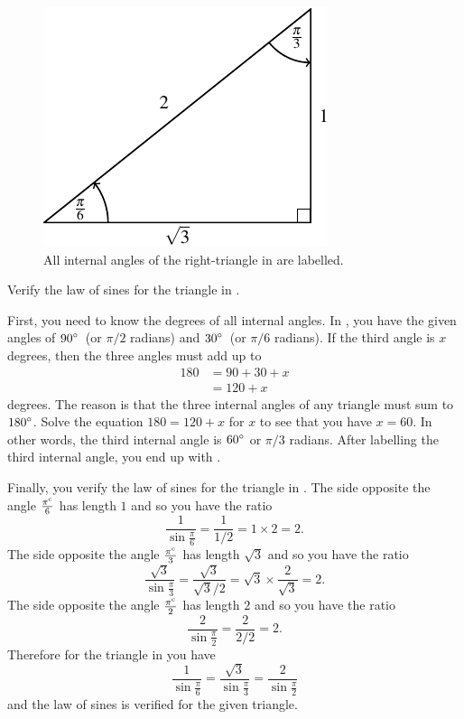 \documentclass[a4paper,oneside,12pt]{article}
\begin{document}
\begin{figure}[!htbp]
\centering
\includegraphics[scale=1]{image/04/right-triangle-60-degree.pdf}
\caption{%
  All internal angles of the right-triangle in
   are labelled.
}
\label{fig:right_triangle_third_angle_60_degrees_labelled}
\end{figure}

\begin{example}
Verify the law of sines for the triangle in
.
\end{example}

\begin{solution}
First, you need to know the degrees of all internal angles.  In
, you have the given angles of
$\degree{90}$~(or $\pi / 2$ radians) and
$\degree{30}$~(or $\pi / 6$ radians).  If the third angle is $x$
degrees, then the three angles must add up to
\begin{align*}
180
&=
90 + 30 + x \\[4pt]
&=
120 + x
\end{align*}
degrees.  The reason is that the three internal angles of any triangle
must sum to $\degree{180}$.  Solve the equation $180 = 120 + x$ for
$x$ to see that you have $x = 60$.  In other words, the third internal
angle is $\degree{60}$ or $\pi / 3$ radians.  After labelling the
third internal angle, you end up with
.

Finally, you verify the law of sines for the triangle in
.  The side
opposite the angle $\frac{\radian{\pi}}{6}$ has length $1$ and so you
have the ratio
\[
\frac{1}{\sin\frac{\pi}{6}}
=
\frac{1}{1/2}
=
1 \times 2
=
2.
\]
The side opposite the angle $\frac{\radian{\pi}}{3}$ has length
$\sqrt{3}$ and so you have the ratio
\[
\frac{\sqrt{3}}{\sin\frac{\pi}{3}}
=
\frac{\sqrt{3}}{\sqrt{3} / 2}
=
\sqrt{3} \times \frac{2}{\sqrt{3}}
=
2.
\]
The side opposite the angle $\frac{\radian{\pi}}{2}$ has length $2$
and so you have the ratio
\[
\frac{2}{\sin\frac{\pi}{2}}
=
\frac{2}{2/2}
=
2.
\]
Therefore for the triangle in
 you have
\[
\frac{1}{\sin\frac{\pi}{6}}
=
\frac{\sqrt{3}}{\sin\frac{\pi}{3}}
=
\frac{2}{\sin\frac{\pi}{2}}
\]
and the law of sines is verified for the given triangle.
\end{solution}
\end{document}
